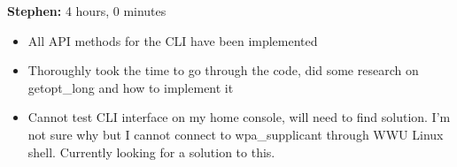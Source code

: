 \documentclass[11pt]{article}
\begin{document}
\textbf{Stephen:} 4 hours, 0 minutes 
\begin{itemize}
  \item All API methods for the CLI have been implemented 
  \item Thoroughly took the time to go through the code, did some research on getopt_long
	and how to implement it
  \item Cannot test CLI interface on my home console, will need to find solution. I'm not 
	sure why but I cannot connect to wpa_supplicant through WWU Linux shell. Currently 
	looking for a solution to this. 
\end{itemize}
\end{document}
